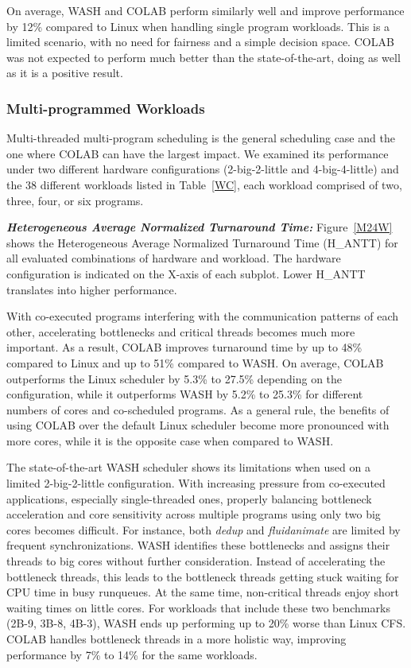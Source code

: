 On average, WASH and COLAB perform similarly well and improve performance by 12\% compared to Linux when handling single program workloads. This is a limited scenario, with no need for fairness and a simple decision space. COLAB was not expected to perform much better than the state-of-the-art, doing as well as it is a positive result.

\subsubsection{Multi-programmed Workloads}
Multi-threaded multi-program scheduling is the general scheduling case and the one where COLAB can have the largest impact. We examined its performance under two different hardware configurations (2-big-2-little and 4-big-4-little) and the 38 different workloads listed in Table~\ref{WC}, each workload comprised of two, three, four, or six programs.

\textbf{\textit{Heterogeneous Average Normalized Turnaround Time:}}
Figure~\ref{M24W} shows the Heterogeneous Average Normalized Turnaround Time (H\_ANTT) for all evaluated combinations of hardware and workload. The hardware configuration is indicated on the X-axis of each subplot. Lower H\_ANTT translates into higher performance.

With co-executed programs interfering with the communication patterns of each other, accelerating bottlenecks and critical threads becomes much more important. As a result, COLAB improves turnaround time by up to 48\% compared to Linux and up to 51\% compared to WASH. On average, COLAB outperforms the Linux scheduler by 5.3\% to 27.5\%  depending on the configuration, while it outperforms WASH by 5.2\% to 25.3\% for different numbers of cores and co-scheduled programs. As a general rule, the benefits of using COLAB over the default Linux scheduler become more pronounced with more cores, while it is the opposite case when compared to WASH.

The state-of-the-art WASH scheduler shows its limitations when used on a limited 2-big-2-little configuration. With increasing pressure from co-executed applications, especially single-threaded ones, properly balancing bottleneck acceleration and core sensitivity across multiple programs using only two big cores becomes difficult. For instance,  both \emph{dedup} and \emph{fluidanimate} are limited by frequent synchronizations. WASH identifies these bottlenecks and assigns their threads to big cores without further consideration. Instead of accelerating the bottleneck threads, this leads to the bottleneck threads getting stuck waiting for CPU time in busy runqueues. At the same time, non-critical threads enjoy short waiting times on little cores. For workloads that include these two benchmarks (2B-9, 3B-8, 4B-3), WASH ends up performing up to 20\% worse than Linux CFS. COLAB handles bottleneck threads in a more holistic way, improving performance by 7\% to 14\% for the same workloads.

